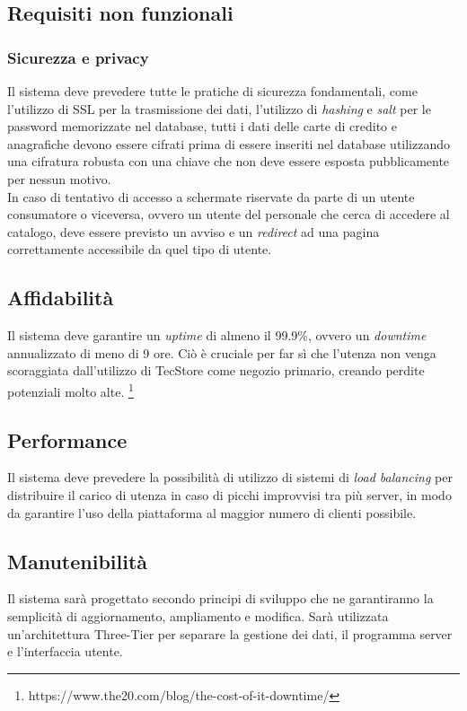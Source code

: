 \documentclass[12pt,a4paper]{article}
\begin{document}
\newpage

\subsection{Requisiti non funzionali}
\subsubsection{Sicurezza e privacy}
Il sistema deve prevedere tutte le pratiche di sicurezza fondamentali, come l'utilizzo di SSL per la trasmissione dei dati, l'utilizzo di \textit{hashing} e \textit{salt} per le password memorizzate nel database, tutti i dati delle carte di credito e anagrafiche devono essere cifrati prima di essere inseriti nel database utilizzando una cifratura robusta con una chiave che non deve essere esposta pubblicamente per nessun motivo. \\
In caso di tentativo di accesso a schermate riservate da parte di un utente consumatore o viceversa, ovvero un utente del personale che cerca di accedere al catalogo, deve essere previsto un avviso e un \textit{redirect} ad una pagina correttamente accessibile da quel tipo di utente.

\subsection{Affidabilità}
Il sistema deve garantire un \emph{uptime} di almeno il 99.9\%, ovvero un \textit{downtime} annualizzato di meno di 9 ore. Ciò è cruciale per far sì che l'utenza non venga scoraggiata dall'utilizzo di TecStore come negozio primario, creando perdite potenziali molto alte. \footnote{https://www.the20.com/blog/the-cost-of-it-downtime/}

\subsection{Performance}
Il sistema deve prevedere la possibilità di utilizzo di sistemi di \textit{load balancing} per distribuire il carico di utenza in caso di picchi improvvisi tra più server, in modo da garantire l'uso della piattaforma al maggior numero di clienti possibile.

\subsection{Manutenibilità}
Il sistema sarà progettato secondo principi di sviluppo che ne garantiranno la semplicità di aggiornamento, ampliamento e modifica.
Sarà utilizzata un'architettura Three-Tier per separare la gestione dei dati, il programma server e l'interfaccia utente.
\end{document}
